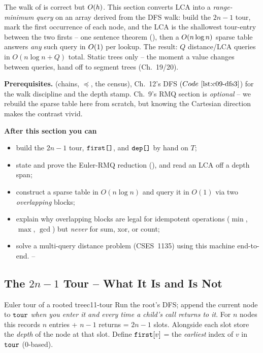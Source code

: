 \begin{topicintro}
The walk of  is correct but \(O(h)\).  This section
converts LCA into a \emph{range-minimum query} on an array derived from
the DFS walk: build the \(2n-1\) tour, mark the first occurrence of each
node, and the LCA is the shallowest tour-entry between the two firsts --
one sentence theorem (), then a \(O(n\log n)\)
sparse table answers \emph{any} such query in \(O(1)\) per lookup.
The result: \(Q\) distance/LCA queries in \(O(n\log n + Q)\) total.
Static trees only -- the moment a value changes between queries, hand
off to segment trees (Ch.~19/20).

\textbf{Prerequisites.}  (chains, \(\preceq\), the
census), Ch.~12's DFS (\(\coderef{c09-dfs3}\)) for the walk discipline
and the depth stamp.  Ch.~9's RMQ section is \emph{optional} -- we
rebuild the sparse table here from scratch, but knowing the Cartesian
direction makes the contrast vivid.

\textbf{After this section you can}
\begin{itemize}[nosep]
  \item build the \(2n\!-\!1\) tour, \(\texttt{first[]}\), and \(\texttt{dep[]}\)
        by hand on \(T\); \hfill{}
  \item state and prove the Euler-RMQ reduction (),
        and read an LCA off a depth span; \hfill{}
  \item construct a sparse table in \(O(n\log n)\) and query it in
        \(O(1)\) via two \emph{overlapping} blocks; \hfill{}
  \item explain why overlapping blocks are legal for idempotent
        operations (\(\min\), \(\max\), \(\gcd\)) but \emph{never} for
        sum, xor, or count; \hfill{}
  \item solve a multi-query distance problem (CSES~1135) using this
        machine end-to-end. \hfill{}--
\end{itemize}
\end{topicintro}

\subsection{The \(2n-1\) Tour -- What It Is and Is Not}

\begin{definition}{Euler tour of a rooted tree}{c11-tour}
Run the root's DFS; append the current node to \(\texttt{tour}\) \emph{when
you enter it and every time a child's call returns to it}.  For \(n\)
nodes this records \(n\) entries + \(n-1\) returns = \(2n-1\) slots.
Alongside each slot store the \emph{depth} of the node at that slot.
Define \(\texttt{first}[v]\) = the \emph{earliest} index of \(v\) in
\(\texttt{tour}\) (0-based).
\end{definition}

